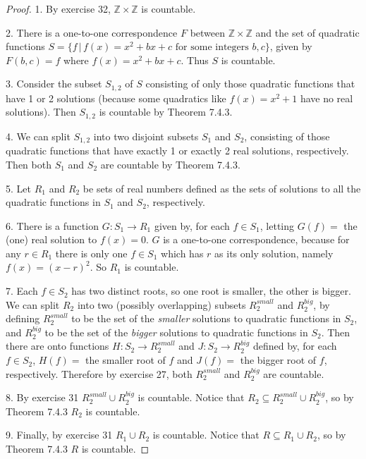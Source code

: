 \documentclass[14pt]{extarticle}
\newcommand{\Z}{\mathbb{Z}}
\begin{document}
\begin{proof}
1. By exercise 32, \(\Z \times \Z\) is countable.

2. There is a one-to-one correspondence $F$ between \(\Z \times \Z\) and the set of quadratic functions \(S = \{f \, 
| \, f(x) = x^2 + bx + c \text{ for some integers } b,c\}\), given by \(F(b,c) = f\) where \(f(x) = x^2 + bx + c\). 
Thus $S$ is countable.

3. Consider the subset $S_{1,2}$ of $S$ consisting of only those quadratic functions that have 1 or 2 solutions 
(because some quadratics like \(f(x) = x^2+1\) have no real solutions). Then $S_{1,2}$ is countable by Theorem 7.4.3.

4. We can split $S_{1,2}$ into two disjoint subsets $S_1$ and $S_2$, consisting of those quadratic functions that 
have exactly 1 or exactly 2 real solutions, respectively. Then both $S_1$ and $S_2$ are countable by Theorem 7.4.3.

5. Let $R_1$ and $R_2$ be sets of real numbers defined as the sets of solutions to all the quadratic functions in 
$S_1$ and $S_2$, respectively.

6. There is a function \(G: S_1 \to R_1\) given by, for each \(f \in S_1\), letting \(G(f) = \) the (one) real
solution to $f(x) = 0$. $G$ is a one-to-one correspondence, because for any $r \in R_1$ there is only one $f \in S_1$
which has $r$ as its only solution, namely \(f(x) = (x-r)^2\). So $R_1$ is countable.

7. Each $f \in S_2$ has two distinct roots, so one root is smaller, the other is bigger. We can split $R_2$ into two 
(possibly overlapping) subsets \(R_2^{small}\) and \(R_2^{big}\), by defining \(R_2^{small}\) to be the set of 
the {\it smaller} solutions to quadratic functions in $S_2$, and \(R_2^{big}\) to be the set of the {\it bigger} 
solutions to quadratic functions in $S_2$. Then there are onto functions \(H: S_2 \to R_2^{small}\) and \(J: S_2 \to 
R_2^{big}\) defined by, for each $f \in S_2$, \(H(f) = \) the smaller root of $f$ and \(J(f) = \) the bigger root of 
$f$, respectively. Therefore by exercise 27, both \(R_2^{small}\) and \(R_2^{big}\) are countable.

8. By exercise 31 \(R_2^{small} \cup R_2^{big}\) is countable. Notice that \(R_2 \subseteq R_2^{small} \cup 
R_2^{big}\), so by Theorem 7.4.3 \(R_2\) is countable.

9. Finally, by exercise 31 \(R_1 \cup R_2\) is countable. Notice that \(R \subseteq R_1 \cup R_2\), so by Theorem 
7.4.3 \(R\) is countable. 
\end{proof}
\end{document}
